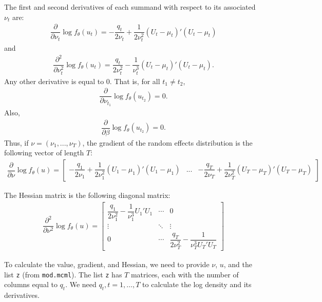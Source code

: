 \documentclass{article}
\begin{document}
The first and second derivatives of each summand with respect to its associated $\nu_t$ are:
\begin{align}
\dfrac{\partial}{\partial \nu_t} \log f_\theta(u_t) = - \dfrac{q_t}{2 \nu_t} + \dfrac{1}{2 \nu_t^2}(U_t-\mu_t)'(U_t-\mu_t)
\end{align}
and 
\begin{align}
\dfrac{\partial^2}{\partial \nu_t^2} \log f_\theta(u_t) = \dfrac{q_t}{2 \nu_t^2}- \dfrac{1}{\nu_t^3} (U_t-\mu_t)'(U_t-\mu_t).
\end{align}
Any other derivative is equal to 0. That is, for all $t_1 \neq t_2$,
\begin{align}
\dfrac{\partial}{\partial \nu_{t_1}} \log f_\theta(u_{t_2}) = 0.
\end{align}
Also,
\begin{align}
\dfrac{\partial}{\partial \beta} \log f_\theta(u_{t_2}) = 0.
\end{align}
Thus, if $\nu = (\nu_1,...,\nu_T)$, the gradient of the random effects distribution is the following vector of length $T$:
\begin{align}
\dfrac{\partial}{\partial \nu}  \log f_\theta(u) = \begin{bmatrix} - \dfrac{q_1}{2 \nu_1} + \dfrac{1}{2 \nu_1^2} (U_1-\mu_1) ' (U_1-\mu_1) & ... & - \dfrac{q_T}{2 \nu_T} + \dfrac{1}{2 \nu_T^2} (U_T-\mu_T) '(U_T-\mu_T)   \end{bmatrix} 
\end{align}

The Hessian matrix is the following diagonal matrix:
\begin{align}
\dfrac{\partial^2}{\partial \nu^2} \log f_\theta(u) = \begin{bmatrix} \dfrac{q_1}{2 \nu_1^2}- \dfrac{1}{\nu_1^3} U_1'U_1 & \cdots & 0 \\ \vdots & \ddots & \vdots \\ 0 & \cdots & \dfrac{q_T}{2 \nu_T^2}- \dfrac{1}{\nu_T^3 U_T'U_T} \end{bmatrix}
\end{align}

To calculate the value, gradient, and Hessian, we need to provide  $\nu$, $u$, and the list \texttt{z} (from \texttt{mod.mcml}).  The list \texttt{z} has $T$ matrices, each with the number of columns equal to $q_t$. We need $q_t,t=1,\ldots,T$ to calculate the log density and its derivatives.
\end{document}
